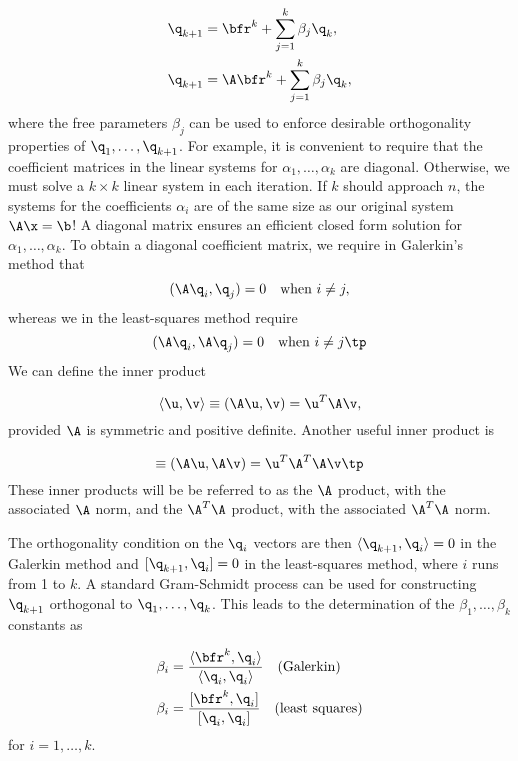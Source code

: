 \begin{align}
\q_{k+1} &= \bfr^k + \sum_{j=1}^k\beta_j\q_k, \label{linalg:q:update1}\\
\q_{k+1} &= \A\bfr^k + \sum_{j=1}^k\beta_j\q_k,\label{linalg:q:update2}
\end{align}
where the free parameters $\beta_j$ can be used to enforce desirable
orthogonality properties of $\q_1,\ldots,\q_{k+1}$. For example,
it is convenient to require that the coefficient matrices in the linear
systems for $\alpha_1,\ldots,\alpha_k$ are diagonal.
Otherwise, we must solve a $k\times k$ linear system in each iteration.
If $k$ should approach
$n$, the systems for the coefficients $\alpha_i$ are of
the same size as our original system $\A\x =\b$!
A diagonal matrix ensures an efficient closed form solution for
$\alpha_1,\ldots,\alpha_k$.
To obtain a diagonal coefficient matrix, we require in Galerkin's method
that
\[ (\A\q_i,\q_j)=0\quad \mbox{when}\ i\neq j, \]
whereas we in the least-squares method require
\[ (\A\q_i,\A\q_j)=0\quad \mbox{when}\ i\neq j\tp \]
We can define
the inner product

\begin{equation}
\langle \u,\v\rangle\equiv (\A\u,\v ) =\u^T\A\v,
\end{equation}
provided $\A$ is symmetric and positive definite. Another
useful inner product is

\begin{equation}
[\u,\v ]\equiv (\A\u,\A\v) = \u^T\A^T\A\v \tp
\end{equation}
These inner products will be be referred to as the $\A$ product, with the
associated $\A$ norm, and the $\A^T\A$ product, with the associated
$\A^T\A$ norm.

The orthogonality condition on the $\q_i$ vectors are then
$\langle \q_{k+1},\q_i\rangle =0$ in the Galerkin method
and  $[\q_{k+1},\q_i]=0$ in the least-squares method, where $i$
runs from 1 to $k$.
A standard Gram-Schmidt process can be used for constructing
$\q_{k+1}$ orthogonal to $\q_1,\ldots,\q_k$. This leads to the determination
of the $\beta_1,\ldots,\beta_k$ constants as

\begin{align}
\beta_i &= { \langle\bfr^k,\q_i\rangle\over\langle\q_i,\q_i\rangle}
\quad\hbox{(Galerkin)}\label{linsys:betaiG}\\
\beta_i &= { [\bfr^k,\q_i]\over [\q_i,\q_i] }
\quad\hbox{(least squares)}
\end{align}
for $i=1,\ldots,k$.

